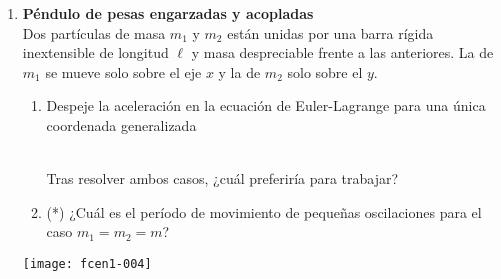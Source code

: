 \documentclass[11pt, spanish, a4paper, twoside]{article}
\begin{document}
\begin{enumerate}
\item 
\begin{minipage}[t][5.5cm]{0.7\textwidth}
	\textbf{Péndulo de pesas engarzadas y acopladas}\\ 
	Dos partículas de masa \(m_1\) y \(m_2\) están unidas por una barra rígida inextensible de longitud \(\ell\) y masa despreciable frente a las anteriores.
	La de \(m_1\) se mueve solo sobre el eje \(x\) y la de \(m_2\) solo sobre el \(y\).
\begin{enumerate}
	\item Despeje la aceleración en la ecuación de Euler-Lagrange para una única coordenada generalizada\\
	\\ %
	Tras resolver ambos casos, ¿cuál preferiría para trabajar?
	\item (*) ¿Cuál es el período de movimiento de pequeñas oscilaciones para el caso \(m_1 = m_2 = m\)?
\end{enumerate}
\end{minipage}
\begin{minipage}[c][0cm][t]{0.3\textwidth}
	\texttt{[image: fcen1-004]}
\end{minipage}




\end{enumerate}
\end{document}
